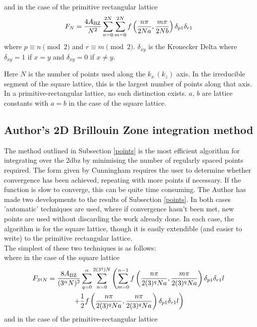 \documentclass[a4paper, 12pt]{article}
\begin{document}
	and in the case of the primitive rectangular lattice
	\begin{equation}\label{CPrectangle}
		F_N =\frac{4A_{\rm BZ}}{N^2}\sum_{n=0}^{2N}\sum_{m=0}^{2N} f\left(\frac{n\pi}{2Na}, \frac{m\pi}{2Nb}\right)\delta_{p 1}\delta_{r 1}
	\end{equation}
	where $p \equiv n\pmod 2$ and $r \equiv m\pmod 2$. $\delta_{x y}$ is the Kronecker Delta where $\delta_{x y} = 1$ if $x=y$ and $\delta_{x y} = 0$ if $x\neq y$.
	\\\par Here $N$ is the number of points used along the $k_x\,(k_z)$ axis. In the irreducible segment of the square lattice, this is the largest number of points along that axis. In a primitive-rectangular lattice, no such distinction exists. $a,\,b$ are lattice constants with $a=b$ in the case of the square lattice.

	\subsection{Author's 2D Brillouin Zone integration method}
	\qquad The method outlined in Subsection \ref{points} is the most efficient algorithm for integrating over the \gls{2dbz} by minimising the number of regularly spaced points required. The form given by Cunningham requires the user to determine whether convergence has been achieved, repeating with more points if necessary. If the function is slow to converge, this can be quite time consuming. 
	The Author has made two developments to the results of Subsection \ref{points}. In both cases 'automatic' techniques are used, where if convergence hasn't been met, new points are used without discarding the work already done. In each case, the algorithm is for the square lattice, though it is easily extendible (and easier to write) to the primitive rectangular lattice. 
	\\[2mm]
	The simplest of these two techniques is as follows: 
	\\[2mm]where in the case of the square lattice
\begin{multline}\label{auto_square}
		F_{3^qN} =\frac{8A_{\rm BZ}}{(3^\alpha N)^2}\sum_{q=0}^\alpha\sum_{n=0}^{2(3^q)N}\left(\sum_{m=0}^{n-1} f\left(\frac{n\pi}{2(3)^qNa}, \frac{m\pi}{2(3)^qNa}\right)\delta_{p 1}\delta_{r 1}l\right.\\\left.+\frac{1}{2}f\left(\frac{n\pi}{2(3)^qNa}, \frac{n\pi}{2(3)^qNa}\right)\delta_{p 1}\delta_{r 1}l\right)
	\end{multline}
	and in the case of the primitive-rectangular lattice
\end{document}
